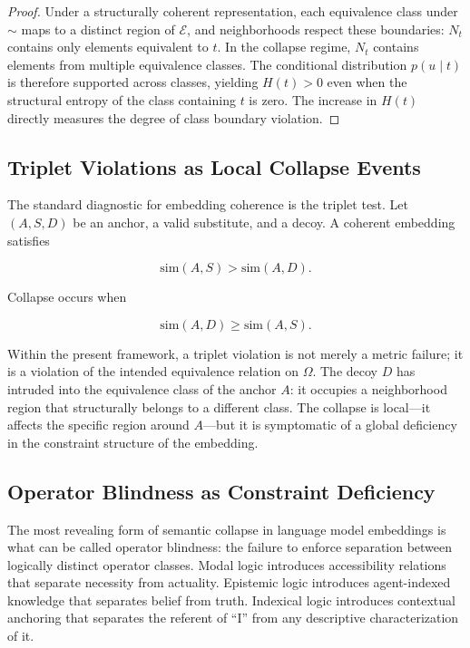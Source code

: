 \documentclass[11pt, twoside]{article}
\theoremstyle{plain}
\theoremstyle{definition}
\theoremstyle{remark}
\begin{document}
\begin{proof}
Under a structurally coherent representation, each equivalence class under $\sim$ maps to a distinct region of $\mathcal{E}$, and neighborhoods respect these boundaries: $N_t$ contains only elements equivalent to $t$. In the collapse regime, $N_t$ contains elements from multiple equivalence classes. The conditional distribution $p(u \mid t)$ is therefore supported across classes, yielding $H(t) > 0$ even when the structural entropy of the class containing $t$ is zero. The increase in $H(t)$ directly measures the degree of class boundary violation.
\end{proof}

\subsection{Triplet Violations as Local Collapse Events}

The standard diagnostic for embedding coherence is the triplet test. Let $(A, S, D)$ be an anchor, a valid substitute, and a decoy. A coherent embedding satisfies

\[
\mathrm{sim}(A, S) > \mathrm{sim}(A, D).
\]

Collapse occurs when

\[
\mathrm{sim}(A, D) \geq \mathrm{sim}(A, S).
\]

Within the present framework, a triplet violation is not merely a metric failure; it is a violation of the intended equivalence relation on $\Omega$. The decoy $D$ has intruded into the equivalence class of the anchor $A$: it occupies a neighborhood region that structurally belongs to a different class. The collapse is local---it affects the specific region around $A$---but it is symptomatic of a global deficiency in the constraint structure of the embedding.

\subsection{Operator Blindness as Constraint Deficiency}

The most revealing form of semantic collapse in language model embeddings is what can be called operator blindness: the failure to enforce separation between logically distinct operator classes. Modal logic introduces accessibility relations that separate necessity from actuality. Epistemic logic introduces agent-indexed knowledge that separates belief from truth. Indexical logic introduces contextual anchoring that separates the referent of ``I'' from any descriptive characterization of it.
\end{document}
